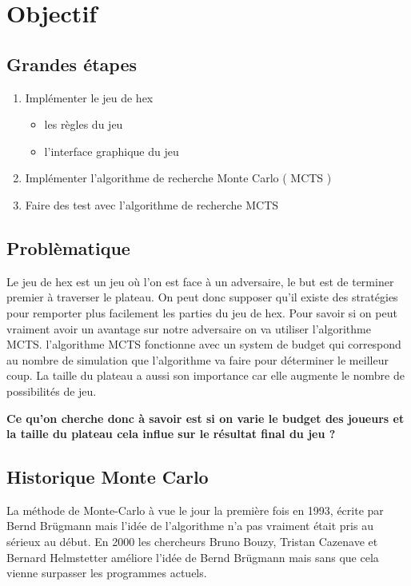 \documentclass[12pt]{article}
\begin{document}
\section{Objectif}

	\subsection{Grandes étapes}
	
\begin{enumerate}
	\item Implémenter le jeu de hex
	\begin{itemize}
		\item les règles du jeu
		\item l'interface graphique du jeu
	\end{itemize}
	\item Implémenter l'algorithme de recherche Monte Carlo ( MCTS ) 
	\item Faire des test avec l'algorithme de recherche MCTS 
\end{enumerate}

	\subsection{Problèmatique}

Le jeu de hex est un jeu où l'on est face à un adversaire, le but est de terminer premier à traverser le plateau. On peut donc supposer qu'il existe des stratégies pour remporter plus facilement les parties du jeu de hex. Pour savoir si on peut vraiment avoir un avantage sur notre adversaire on va utiliser l'algorithme MCTS. l'algorithme MCTS fonctionne avec un system de budget qui correspond au nombre de simulation que l'algorithme va faire pour déterminer le meilleur coup. La taille du plateau a aussi son importance car elle augmente le nombre de possibilités de jeu.


\textbf{Ce qu'on cherche donc à savoir est si on varie le budget des joueurs et la taille du plateau cela influe sur le résultat final du jeu ?}

	\subsection{Historique Monte Carlo}
	
La méthode de Monte-Carlo à vue le jour la première fois en 1993, écrite par Bernd Brügmann mais l'idée de l'algorithme n'a pas vraiment était pris au sérieux au début. En 2000 les chercheurs Bruno Bouzy, Tristan Cazenave et Bernard Helmstetter améliore l'idée de Bernd Brügmann mais sans que cela vienne surpasser les programmes actuels.
\end{document}

